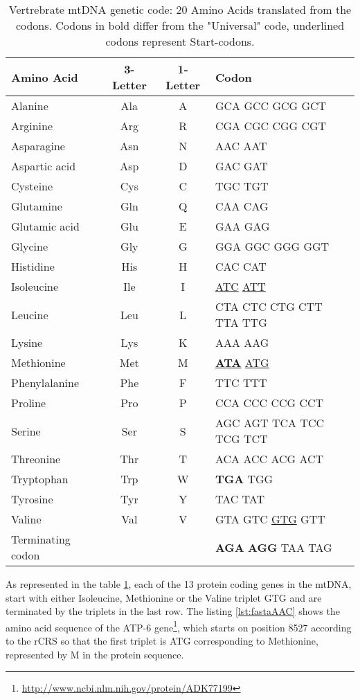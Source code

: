 \begin{table}[ht]
\begin{tabular}{lccl}
\textbf{Amino Acid}&\textbf{3-Letter}&\textbf{1-Letter}&\textbf{Codon}\\ 
\hline
Alanine&Ala&A&GCA GCC GCG GCT \\ 
Arginine&Arg&R&CGA CGC CGG CGT \\ 
Asparagine&Asn&N&AAC AAT\\ 
Aspartic acid&Asp&D&GAC GAT \\ 
Cysteine&Cys&C&TGC TGT \\ 
Glutamine&Gln&Q&CAA CAG \\ 
Glutamic acid&Glu&E&GAA GAG \\ 
Glycine&Gly&G&GGA GGC GGG GGT \\ 
Histidine&His&H&CAC CAT \\ 
Isoleucine&Ile&I&\underline{ATC} \underline{ATT} \\ 
Leucine&Leu&L&CTA CTC CTG CTT TTA TTG\\ 
Lysine&Lys&K&AAA AAG \\ 
Methionine&Met&M&\textbf{\underline{ATA}} \underline{ATG}\\ 
Phenylalanine&Phe&F&TTC TTT \\ 
Proline&Pro&P&CCA CCC CCG CCT \\ 
Serine&Ser&S&AGC AGT TCA TCC TCG TCT\\ 
Threonine&Thr&T&ACA ACC ACG ACT \\ 
Tryptophan&Trp&W&\textbf{TGA} TGG \\ 
Tyrosine&Tyr&Y&TAC TAT \\ 
Valine&Val&V&GTA GTC \underline{GTG} GTT  \\ 
Terminating codon&&&\textbf{AGA} \textbf{AGG} TAA TAG \\ 
\end{tabular}
\caption[Vertrebrate mtDNA genetic code]{Vertrebrate mtDNA genetic code: 20 Amino Acids translated from the codons. Codons in bold differ from the "Universal" code, underlined codons represent Start-codons. }
\label{tbl:aac}
\end{table}
As represented in the table \ref{tbl:aac}, each of the 13 protein coding genes in the mtDNA, start with either Isoleucine, Methionine or the Valine triplet GTG and are terminated by the triplets in the last row. The listing \ref{lst:fastaAAC} shows the amino acid sequence of the ATP-6 gene\footnote{\url{http://www.ncbi.nlm.nih.gov/protein/ADK77199}}, which starts on position 8527 according to the rCRS so that the first triplet is ATG corresponding to Methionine, represented by M in the protein sequence.
